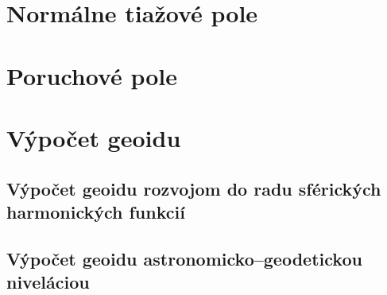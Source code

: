 \documentclass[a4paper, 12pt]{book}
\begin{document}
{%







\chapter{Normálne tiažové pole}








\chapter{Poruchové pole}








\chapter{Výpočet geoidu}







\section{Výpočet geoidu rozvojom do radu sférických harmonických funkcií}







\section{Výpočet geoidu astronomicko--geodetickou niveláciou}






}
\end{document}
